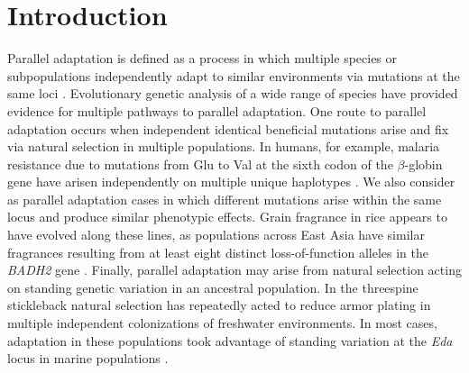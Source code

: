 \section*{Introduction}
\noindent Parallel adaptation is defined as a process in which multiple species or subpopulations independently adapt to similar environments via mutations at the same loci \cite[]{Wood_2005_15881688,Arendt_2008_18022278,Elmer_2011_21459472}.
Evolutionary genetic analysis of a wide range of species have provided evidence for multiple pathways to parallel adaptation. One route to parallel adaptation occurs when independent identical beneficial mutations arise and fix via natural selection in multiple populations. In humans, for example, malaria resistance due to mutations from Glu to Val at the sixth codon of the $\beta$-globin gene have arisen independently on multiple unique haplotypes  \cite[]{Currat_2002_11741197,Kwiatkowski_2005_16001361}.  We also consider as parallel adaptation cases in which different mutations arise within the same locus and produce similar phenotypic effects.  Grain fragrance in rice appears to have evolved along these lines, as populations across East Asia have similar fragrances resulting from at least eight distinct loss-of-function alleles in the  \emph{BADH2} gene \cite[]{Kovach_2009_19706531}.  Finally, parallel adaptation may arise from natural selection acting on standing genetic variation in an ancestral population.  In the threespine stickleback natural selection has repeatedly acted to reduce armor plating in multiple independent colonizations of freshwater environments.  In most cases, adaptation in these populations took advantage of standing variation at the \emph{Eda} locus in marine populations \cite[]{Colosimo_2005_15790847}.  
%
%

%
%
%
%

